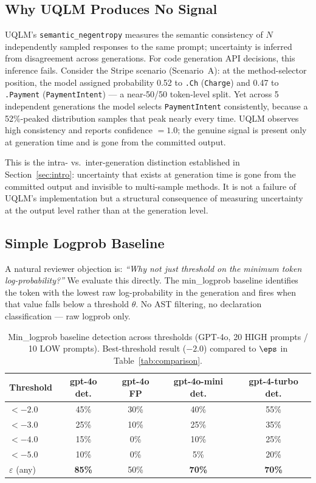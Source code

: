 \subsection{Why UQLM Produces No Signal}
\label{sec:comp-why}

UQLM's \texttt{semantic\_negentropy} measures the semantic consistency of
$N$ independently sampled responses to the same prompt; uncertainty is
inferred from disagreement across generations. For code generation API
decisions, this inference fails. Consider the
Stripe scenario (Scenario~A): at
the method-selector position, the model assigned probability 0.52 to
\texttt{.Ch} (\texttt{Charge}) and 0.47 to \texttt{.Payment}
(\texttt{PaymentIntent}) --- a near-50/50 token-level split. Yet across 5
independent generations the model selects \texttt{PaymentIntent}
consistently, because a 52\%-peaked distribution samples that peak nearly
every time. UQLM observes high consistency and reports confidence $= 1.0$;
the genuine signal is present only at generation time and is gone from the
committed output.

This is the intra- vs.\ inter-generation distinction established in
Section~\ref{sec:intro}: uncertainty that exists at generation time is gone
from the committed output and invisible to multi-sample methods.
It is not a failure of UQLM's implementation but a structural consequence
of measuring uncertainty at the output level rather than at the generation
level.

\subsection{Simple Logprob Baseline}
\label{sec:comp-logprob}

A natural reviewer objection is: \emph{``Why not just threshold on the
minimum token log-probability?''} We evaluate this directly. The
min\_logprob baseline identifies the token with the lowest raw log-probability
in the generation and fires when that value falls below a threshold $\theta$.
No AST filtering, no declaration classification --- raw logprob only.

\begin{table}[h]
\centering
\caption{Min\_logprob baseline detection across thresholds (GPT-4o, 20 HIGH
         prompts / 10 LOW prompts). Best-threshold result (${-2.0}$) compared
         to $\eps$ in Table~\ref{tab:comparison}.}
\label{tab:logprob-baseline}
\small
\begin{tabular}{lcccc}
\toprule
\textbf{Threshold} & \textbf{gpt-4o det.} & \textbf{gpt-4o FP}
                   & \textbf{gpt-4o-mini det.} & \textbf{gpt-4-turbo det.} \\
\midrule
$< -2.0$ & 45\% & 30\% & 40\% & 55\% \\
$< -3.0$ & 25\% & 10\% & 25\% & 35\% \\
$< -4.0$ & 15\% & 0\%  & 10\% & 25\% \\
$< -5.0$ & 10\% & 0\%  & 5\%  & 20\% \\
\midrule
$\varepsilon$ (any) & \textbf{85\%} & 50\% & \textbf{70\%} & \textbf{70\%} \\
\bottomrule
\end{tabular}
\normalsize
\end{table}


